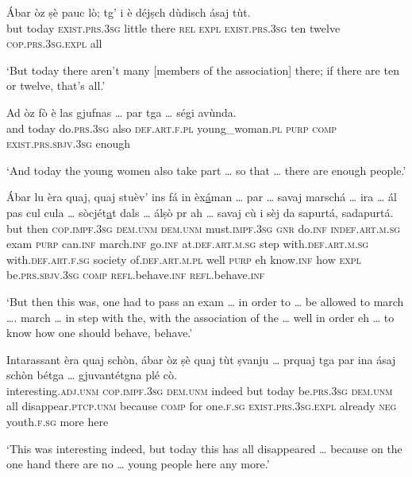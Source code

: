 \begin{linenumbers}
	\gll    Ábar òz ṣè pauc lò; tg’ i è déjṣch dùdisch ásaj tùt.\\
	but today \textsc{exist.prs.3sg} little there \textsc{rel} \textsc{expl} \textsc{exist.prs.3sg} ten twelve \textsc{cop.prs.3sg.expl} all\\
\end{linenumbers}
\medskip
\glt `But today there aren’t many [members of the association] there; if there are ten or twelve, that’s all.'
\medskip

\begin{linenumbers}
	\gll    Ad òz fò è las gjufnas … par tga … ségi avùnda.\\
	and today do.\textsc{prs.3sg} also  \textsc{def.art.f.pl} young\_woman.\textsc{pl} {} \textsc{purp} \textsc{comp} {} \textsc{exist.prs.sbjv.3sg} enough\\
\end{linenumbers}
\medskip
\glt `And today the young women also take part … so that … there are enough people.'
\medskip

\begin{linenumbers}
	\gll    Ábar lu èra quaj, quaj stuèv’ ins fá in èx\underline{á}man … par … savaj marschá … ira … ál pas cul cula … sòcjét\underline{a}t dals … álṣò pr ah … savaj cù i sèj da sapurtá, sadapurtá.\\
	but then \textsc{cop.impf.3sg} \textsc{dem.unm} \textsc{dem.unm} must.\textsc{impf.3sg} \textsc{gnr} do.\textsc{inf} \textsc{indef.art.m.sg} exam {} \textsc{purp} {} can.\textsc{inf} march.\textsc{inf} {} go.\textsc{inf} {} at.\textsc{def.art.m.sg} step with.\textsc{def.art.m.sg} with.\textsc{def.art.f.sg} {} society  of.\textsc{def.art.m.pl} {} well \textsc{purp} eh {} know.\textsc{inf} how \textsc{expl} be.\textsc{prs.sbjv.3sg} \textsc{comp} \textsc{refl.}behave.\textsc{inf} \textsc{refl.}behave.\textsc{inf}\\
\end{linenumbers}
\medskip
\glt `But then this was, one had to pass an exam … in order to … be allowed to march …. march … in step with the, with the association of the … well in order eh … to know how one should behave, behave.'
\medskip

\begin{linenumbers}
	\gll    Intarassant èra quaj schòn, ábar òz ṣè quaj tùt ṣvanju … prquaj tga par ina ásaj schòn bétga … gjuvantétgna plé cò.\\
	interesting.\textsc{adj.unm} \textsc{cop.impf.3sg} \textsc{dem.unm} indeed but today be.\textsc{prs.3sg} \textsc{dem.unm} all disappear.\textsc{ptcp.unm} {} because \textsc{comp} for one.\textsc{f.sg} \textsc{exist.prs.3sg.expl} already \textsc{neg} {} youth.\textsc{f.sg} more here \\
\end{linenumbers}
\medskip
\glt `This was interesting indeed, but today this has all disappeared … because on the one hand there are no … young people here any more.'
\medskip

